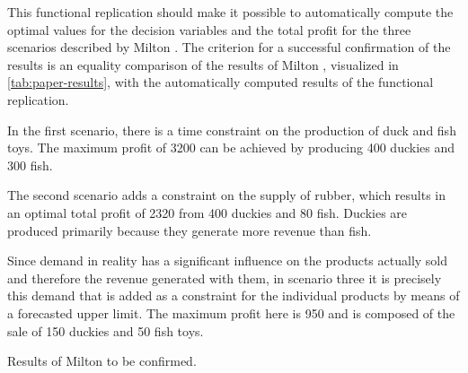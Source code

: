\documentclass[sigconf, nonacm]{acmart}
\begin{document}
This functional replication should make it possible to automatically compute the optimal values for the decision variables and the total profit for the three scenarios described by Milton \cite{Milton2009}. The criterion for a successful confirmation of the results is an equality comparison of the results of Milton \cite{Milton2009}, visualized in \autoref{tab:paper-results}, with the automatically computed results of the functional replication. 


In the first scenario, there is a time constraint on the production of duck and fish toys. The maximum profit of 3200 can be achieved by producing 400 duckies and 300 fish. 


The second scenario adds a constraint on the supply of rubber, which results in an optimal total profit of 2320 from 400 duckies and 80 fish. Duckies are produced primarily because they generate more revenue than fish. 

Since demand in reality has a significant influence on the products actually sold and therefore the revenue generated with them, in scenario three it is precisely this demand that is added as a constraint for the individual products by means of a forecasted upper limit. The maximum profit here is 950 and is composed of the sale of 150 duckies and 50 fish toys.



\begin{table}[htbp]
	\centering
	\caption{Results of Milton \cite{Milton2009} to be confirmed.}
	\label{tab:paper-results}
\end{table}
	
\end{document}
